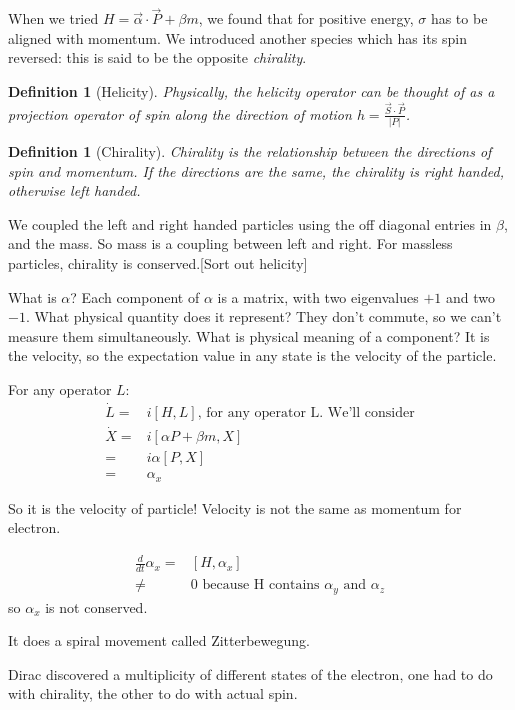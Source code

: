 \documentclass[]{article}
\newtheorem{defn}[thm]{Definition}
\begin{document}
When we tried $H=\vec{\alpha} \cdot \vec{P}+\beta m$, we found that for positive energy, $\sigma$ has to be aligned with momentum. We introduced another species which has its spin reversed: this is said to be the opposite \emph{chirality}.

\begin{defn}[Helicity]
	 Physically, the helicity operator can be thought of as a projection operator of spin along the direction of motion $h=\frac{\vec{S}\cdot\vec{P}}{\lvert P \rvert}$.
\end{defn}
\begin{defn}[Chirality]
	Chirality is the relationship between the directions of spin and momentum. If the directions are the same, the chirality is right handed, otherwise left handed.\cite{meredith2018helicity}
\end{defn}

We coupled the left and right handed particles using the off diagonal entries in $\beta$, and the mass. So mass is a coupling between left and right. For massless particles, chirality is conserved.[Sort out helicity]

What is $\alpha$? Each component of $\alpha$ is a matrix, with two eigenvalues $+1$ and two $-1$. What physical quantity does it represent? They don't commute, so we can't measure them simultaneously. What is physical meaning of a component? It is the velocity, so the expectation value in any state is the velocity of the particle.

For any operator $L$:
\begin{align*}
	\dot L =& i [H,L] \text{, for any operator L. We'll consider}\\
	\dot X =& i[\alpha P + \beta m,X]\\
	=& i \alpha [P,X]\\
	=&\alpha_x
\end{align*}

So it is the velocity of particle! Velocity is not the same as momentum for electron.

\begin{align*}
	\frac{d}{dt} \alpha_x=&[H,\alpha_x]\\
	 \ne& 0 \text{ because H contains $\alpha_y$ and $\alpha_z$}
\end{align*}
so $\alpha_x$ is not conserved.

It does a spiral movement called Zitterbewegung.

Dirac discovered a multiplicity of different states of the electron, one had to do with chirality, the other to do with actual spin.
\end{document}
